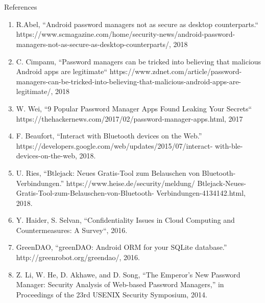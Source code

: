 \documentclass{beamer}
\begin{document}
\section*{}
\begin{frame}[shrink=50]{References}
\vspace{-15mm}
\begin{enumerate}
	\item R.Abel, “Android password managers not as secure as desktop counterparts.“ https://www.scmagazine.com/home/security-news/android-password-managers-not-as-secure-as-desktop-counterparts/, 2018 \\
	\item C. Cimpanu, “Password managers can be tricked into believing that malicious Android apps are legitimate“ https://www.zdnet.com/article/password-managers-can-be-tricked-into-believing-that-malicious-android-apps-are-legitimate/, 2018 \\
	\item W. Wei, “9 Popular Password Manager Apps Found Leaking Your Secrets“ https://thehackernews.com/2017/02/password-manager-apps.html, 2017 \\
	\item F. Beaufort, “Interact with Bluetooth devices on the Web.” https://developers.google.com/web/updates/2015/07/interact- with-ble-devices-on-the-web, 2018. \\
	\item U. Ries, “Btlejack: Neues Gratis-Tool zum Belauschen von Bluetooth- Verbindungen.” https://www.heise.de/security/meldung/ Btlejack-Neues-Gratis-Tool-zum-Belauschen-von-Bluetooth- Verbindungen-4134142.html, 2018. \\
	\item Y. Haider, S. Selvan, “Confidentiality Issues in Cloud Computing and Countermeasures: A Survey“, 2016. \\
	\item GreenDAO, “greenDAO: Android ORM for your SQLite database.” http://greenrobot.org/greendao/, 2016. \\
	\item Z. Li, W. He, D. Akhawe, and D. Song, “The Emperor’s New Password Manager: Security Analysis of Web-based Password Managers,” in Proceedings of the 23rd USENIX Security Symposium, 2014. \\
\end{enumerate}
\end{frame}

\end{document}
